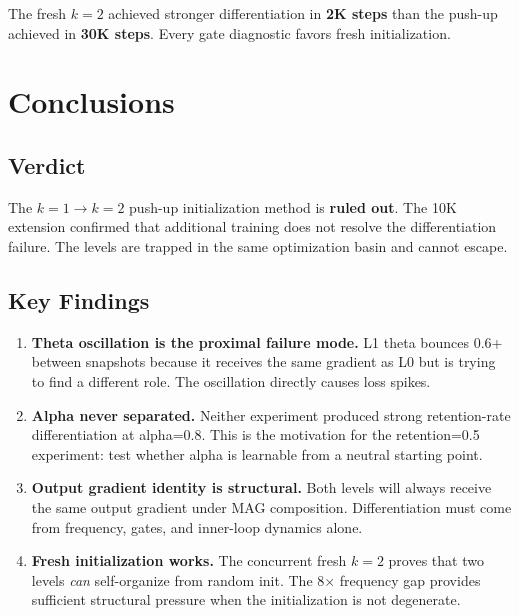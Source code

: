 \documentclass[11pt,a4paper]{article}
\begin{document}
\noindent The fresh $k{=}2$ achieved stronger differentiation in \textbf{2K steps} than the
push-up achieved in \textbf{30K steps}. Every gate diagnostic favors fresh initialization.


\section{Conclusions}

\subsection{Verdict}

The $k{=}1 \to k{=}2$ push-up initialization method is \textbf{ruled out}. The 10K extension
confirmed that additional training does not resolve the differentiation failure. The levels are
trapped in the same optimization basin and cannot escape.

\subsection{Key Findings}

\begin{enumerate}[topsep=4pt, itemsep=2pt]
    \item \textbf{Theta oscillation is the proximal failure mode.} L1 theta bounces 0.6+ between
    snapshots because it receives the same gradient as L0 but is trying to find a different role.
    The oscillation directly causes loss spikes.

    \item \textbf{Alpha never separated.} Neither experiment produced strong retention-rate
    differentiation at alpha=0.8. This is the motivation for the retention=0.5 experiment:
    test whether alpha is learnable from a neutral starting point.

    \item \textbf{Output gradient identity is structural.} Both levels will always receive the same
    output gradient under MAG composition. Differentiation must come from frequency, gates,
    and inner-loop dynamics alone.

    \item \textbf{Fresh initialization works.} The concurrent fresh $k{=}2$ proves that two
    levels \emph{can} self-organize from random init. The 8$\times$ frequency gap provides
    sufficient structural pressure when the initialization is not degenerate.
\end{enumerate}
\end{document}
